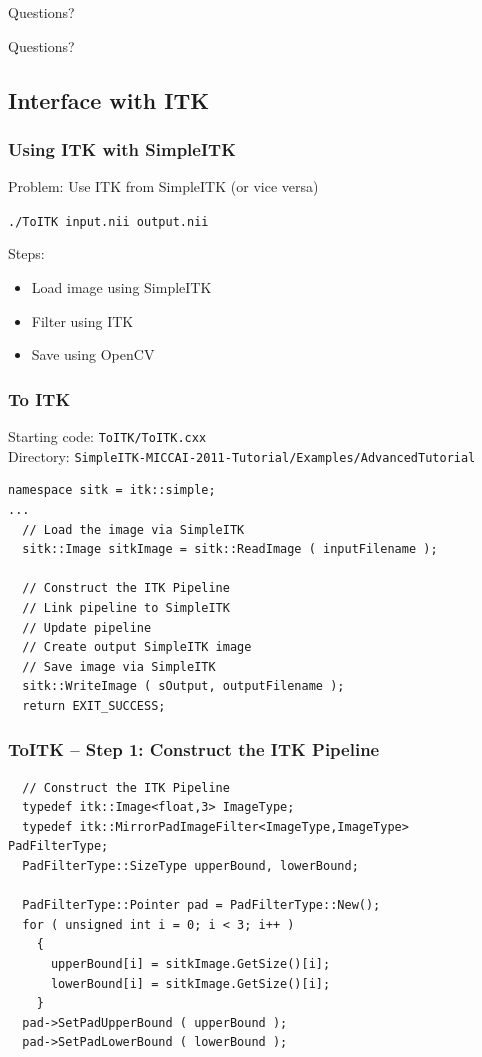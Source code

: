 \begin{frame}{Questions?}
\fontsize{36pt}{36pt}\selectfont
\center
\begin{center}
Questions?
\end{center}
\end{frame}


\subsection{Interface with ITK}
\begin{frame}[fragile]
\frametitle{Using ITK with SimpleITK}
Problem: Use ITK from SimpleITK (or vice versa)

\texttt{./ToITK input.nii output.nii}

Steps:
\begin{itemize}
\item Load image using SimpleITK
\item Filter using ITK
\item Save using OpenCV
\end{itemize}
\end{frame}

\begin{frame}[fragile]
\frametitle{To ITK}
Starting code: \texttt{ToITK/ToITK.cxx}\\
Directory: \texttt{SimpleITK-MICCAI-2011-Tutorial/Examples/AdvancedTutorial}
\begin{lstlisting}
namespace sitk = itk::simple;
...
  // Load the image via SimpleITK
  sitk::Image sitkImage = sitk::ReadImage ( inputFilename );

  // Construct the ITK Pipeline
  // Link pipeline to SimpleITK
  // Update pipeline
  // Create output SimpleITK image
  // Save image via SimpleITK
  sitk::WriteImage ( sOutput, outputFilename );
  return EXIT_SUCCESS;
\end{lstlisting}
\end{frame}

\begin{frame}[fragile]
\frametitle{ToITK -- Step 1: Construct the ITK Pipeline}
\begin{lstlisting}
  // Construct the ITK Pipeline
  typedef itk::Image<float,3> ImageType;
  typedef itk::MirrorPadImageFilter<ImageType,ImageType> PadFilterType;
  PadFilterType::SizeType upperBound, lowerBound;

  PadFilterType::Pointer pad = PadFilterType::New();
  for ( unsigned int i = 0; i < 3; i++ )
    {
      upperBound[i] = sitkImage.GetSize()[i];
      lowerBound[i] = sitkImage.GetSize()[i];
    }
  pad->SetPadUpperBound ( upperBound );
  pad->SetPadLowerBound ( lowerBound );
\end{lstlisting}
\end{frame}

